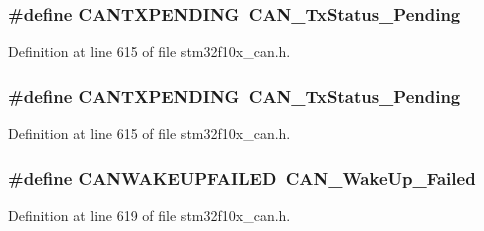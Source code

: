 \subsubsection[{\texorpdfstring{C\+A\+N\+T\+X\+P\+E\+N\+D\+I\+NG}{CANTXPENDING}}]{\setlength{\rightskip}{0pt plus 5cm}\#define C\+A\+N\+T\+X\+P\+E\+N\+D\+I\+NG~{\bf C\+A\+N\+\_\+\+Tx\+Status\+\_\+\+Pending}}\hypertarget{group___c_a_n___legacy_ga76f43f4c54505b1f87b39b056ca38897}{}\label{group___c_a_n___legacy_ga76f43f4c54505b1f87b39b056ca38897}


Definition at line 615 of file stm32f10x\+\_\+can.\+h.

\subsubsection[{\texorpdfstring{C\+A\+N\+T\+X\+P\+E\+N\+D\+I\+NG}{CANTXPENDING}}]{\setlength{\rightskip}{0pt plus 5cm}\#define C\+A\+N\+T\+X\+P\+E\+N\+D\+I\+NG~{\bf C\+A\+N\+\_\+\+Tx\+Status\+\_\+\+Pending}}\hypertarget{group___c_a_n___legacy_ga76f43f4c54505b1f87b39b056ca38897}{}\label{group___c_a_n___legacy_ga76f43f4c54505b1f87b39b056ca38897}


Definition at line 615 of file stm32f10x\+\_\+can.\+h.

\subsubsection[{\texorpdfstring{C\+A\+N\+W\+A\+K\+E\+U\+P\+F\+A\+I\+L\+ED}{CANWAKEUPFAILED}}]{\setlength{\rightskip}{0pt plus 5cm}\#define C\+A\+N\+W\+A\+K\+E\+U\+P\+F\+A\+I\+L\+ED~{\bf C\+A\+N\+\_\+\+Wake\+Up\+\_\+\+Failed}}\hypertarget{group___c_a_n___legacy_ga0de3b0e2c544d9fa772b646e331e51b1}{}\label{group___c_a_n___legacy_ga0de3b0e2c544d9fa772b646e331e51b1}


Definition at line 619 of file stm32f10x\+\_\+can.\+h.

